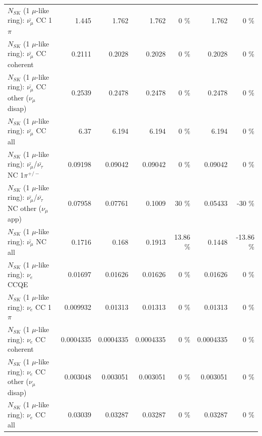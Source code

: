 \begin{table}
\begin{tabular}{| l | r | r | r  r | r  r |}
                         $N_{SK}$ (1 $\mu$-like ring): $\bar{\nu_\mu}$ CC 1$\pi$ &           1.445 &           1.762 &           1.762 &        0 \%  &           1.762 &        0 \%  \\ 
                       $N_{SK}$ (1 $\mu$-like ring): $\bar{\nu_\mu}$ CC coherent &          0.2111 &          0.2028 &          0.2028 &        0 \%  &          0.2028 &        0 \%  \\ 
        $N_{SK}$ (1 $\mu$-like ring): $\bar{\nu_\mu}$ CC other ($\nu_\mu$ disap) &          0.2539 &          0.2478 &          0.2478 &        0 \%  &          0.2478 &        0 \%  \\ 
                          $N_{SK}$ (1 $\mu$-like ring): $\bar{\nu_{\mu}}$ CC all &            6.37 &           6.194 &           6.194 &        0 \%  &           6.194 &        0 \%  \\ 
\hline
  $N_{SK}$ (1 $\mu$-like ring): $\bar{\nu_\mu}$/$\bar{\nu_\tau}$ NC 1$\pi^{+/-}$ &         0.09198 &         0.09042 &         0.09042 &        0 \%  &         0.09042 &        0 \%  \\ 
$N_{SK}$ (1 $\mu$-like ring): $\bar{\nu_\mu}$/$\bar{\nu_\tau}$ NC other ($\nu_\mu$ app) &         0.07958 &         0.07761 &          0.1009 &       30 \%  &         0.05433 &      -30 \%  \\ 
                          $N_{SK}$ (1 $\mu$-like ring): $\bar{\nu_{\mu}}$ NC all &          0.1716 &           0.168 &          0.1913 &    13.86 \%  &          0.1448 &   -13.86 \%  \\ 
\hline
\hline
\hline
                                      $N_{SK}$ (1 $\mu$-like ring): $\nu_e$ CCQE &         0.01697 &         0.01626 &         0.01626 &        0 \%  &         0.01626 &        0 \%  \\ 
                                 $N_{SK}$ (1 $\mu$-like ring): $\nu_e$ CC 1$\pi$ &        0.009932 &         0.01313 &         0.01313 &        0 \%  &         0.01313 &        0 \%  \\ 
                               $N_{SK}$ (1 $\mu$-like ring): $\nu_e$ CC coherent &       0.0004335 &       0.0004335 &       0.0004335 &        0 \%  &       0.0004335 &        0 \%  \\ 
                $N_{SK}$ (1 $\mu$-like ring): $\nu_e$ CC other ($\nu_\mu$ disap) &        0.003048 &        0.003051 &        0.003051 &        0 \%  &        0.003051 &        0 \%  \\ 
                                  $N_{SK}$ (1 $\mu$-like ring): $\nu_{e}$ CC all &         0.03039 &         0.03287 &         0.03287 &        0 \%  &         0.03287 &        0 \%  \\ 

\end{tabular}
\end{table}
